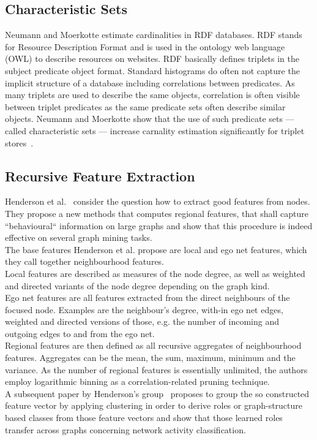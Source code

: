 \subsection{Characteristic Sets}\label{\positionnumber}
Neumann and Moerkotte estimate cardinalities in RDF databases. RDF stands for Resource Description Format and is used in the ontology web language (OWL) to describe resources on websites. RDF basically defines triplets in the subject predicate object format. Standard histograms do often not capture the implicit structure of a database including correlations between predicates. As many triplets are used to describe the same objects, correlation is often visible between triplet predicates as the same predicate sets often describe similar objects. Neumann and Moerkotte show that the use of such predicate sets --- called characteristic sets --- increase carnality estimation significantly for triplet stores~\cite{neumann2011characteristic}.


\subsection{Recursive Feature Extraction}\label{\positionnumber}
Henderson et al.~\cite{henderson2011s} consider the question how to extract good features from nodes. They propose a new methods that computes regional features, that shall capture ``behavioural`` information on large graphs and show that this procedure is indeed effective on several graph mining tasks. \\
The base features Henderson et al. propose are local and ego net features, which they call together neighbourhood features. \\

Local features are described as measures of the node degree, as well as weighted and directed variants of the node degree depending on the graph kind. \\

Ego net features are all features extracted from the direct neighbours of the focused node. Examples are the neighbour's degree, with-in ego net edges, weighted and directed versions of those, e.g. the number of incoming and outgoing edges to and from the ego net. \\

Regional features are then defined as all recursive aggregates of neighbourhood features. Aggregates can be the mean, the sum, maximum, minimum and the variance. As the number of regional features is essentially unlimited, the authors employ logarithmic binning as a correlation-related pruning technique. \\

A subsequent paper by Henderson's group~\cite{henderson2012rolx} proposes to group the so constructed feature vector by applying clustering in order to derive roles or graph-structure based classes from those feature vectors and show that those learned roles transfer across graphs concerning network activity classification. \\
